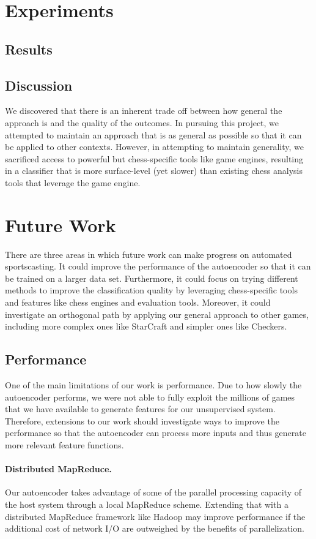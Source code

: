 \documentclass[11pt]{article}
\begin{document}
\section{Experiments}
\subsection{Results}
\subsection{Discussion}
We discovered that there is an inherent trade off between how general the approach is and the quality of the outcomes. In pursuing this project, we attempted to maintain an approach that is as general as possible so that it can be applied to other contexts. However, in attempting to maintain generality, we sacrificed access to powerful but chess-specific tools like game engines, resulting in a classifier that is more surface-level (yet slower) than existing chess analysis tools that leverage the game engine. 

\section{Future Work}
There are three areas in which future work can make progress on automated sportscasting. It could improve the performance of the autoencoder so that it can be trained on a larger data set. Furthermore, it could focus on trying different methods to improve the classification quality by leveraging chess-specific tools and features like chess engines and evaluation tools. Moreover, it could investigate an orthogonal path by applying our general approach to other games, including more complex ones like StarCraft and simpler ones like Checkers.

\subsection{Performance}
One of the main limitations of our work is performance. Due to how slowly the autoencoder performs, we were not able to fully exploit the millions of games that we have available to generate features for our unsupervised system. Therefore, extensions to our work should investigate ways to improve the performance so that the autoencoder can process more inputs and thus generate more relevant feature functions.

\paragraph{Distributed MapReduce.}
Our autoencoder takes advantage of some of the parallel processing capacity of the host system through a local MapReduce scheme. Extending that with a distributed MapReduce framework like Hadoop may improve performance if the additional cost of network I/O are outweighed by the benefits of parallelization.
\end{document}
